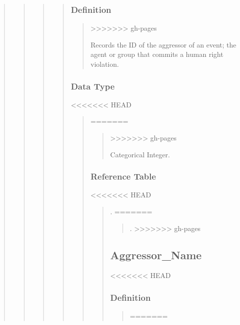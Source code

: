 \documentclass[letterpaper,10pt,english]{sphinxmanual}
\begin{document}
\begin{quote}
\begin{quote}
\begin{quote}
\begin{quote}
\subsubsection{Definition}
\label{\detokenize{schema_tables:id2}}\begin{quote}
>>>>>>> gh-pages

\sphinxAtStartPar
Records the ID of the aggressor of an event; the agent or group that commits a human right violation.
\end{quote}


\subsubsection{Data Type}
<<<<<<< HEAD
\label{\detokenize{database_schema:id3}}\begin{quote}
=======
\label{\detokenize{schema_tables:id3}}\begin{quote}
>>>>>>> gh-pages

\sphinxAtStartPar
Categorical Integer.
\end{quote}


\subsubsection{Reference Table}
<<<<<<< HEAD
\label{\detokenize{database_schema:id4}}\begin{quote}

\sphinxAtStartPar
{\hyperref[\detokenize{database_schema:aggressor-table}]{}} .
=======
\label{\detokenize{schema_tables:id4}}\begin{quote}

\sphinxAtStartPar
{\hyperref[\detokenize{schema_tables:aggressor-table}]{}} .
>>>>>>> gh-pages
\end{quote}


\subsection{Aggressor\_Name}
<<<<<<< HEAD
\label{\detokenize{database_schema:aggressor-name}}

\subsubsection{Definition}
\label{\detokenize{database_schema:id5}}\begin{quote}
=======
\label{\detokenize{schema_tables:aggressor-name}}


\end{quote}
\end{quote}
\end{quote}
\end{quote}
\end{quote}
\end{quote}
\end{quote}
\end{document}
